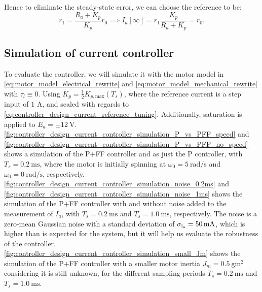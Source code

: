 Hence to eliminate the steady-state error, we can choose the reference to be:
\begin{equation}
    \label{eq:controller_design_current_reference_tuning}
    r_1 = \frac{R_a + K_p}{K_p} r_0 \implies I_a[\infty] = r_1 \frac{K_p}{R_a + K_p} = r_0.
\end{equation}

\subsection{Simulation of current controller}
\label{subsec:current_simulation}

To evaluate the controller, we will simulate it with the motor model in \cref{eq:motor_model_electrical_rewrite} and \cref{eq:motor_model_mechanical_rewrite} with $\tau_l \equiv 0$. Using $K_p=\frac{1}{2}K_{p,\text{max}}(T_s)$, where the reference current is a step input of $1$ A, and scaled with regards to \cref{eq:controller_design_current_reference_tuning}. Additionally, saturation is applied to $E_a=\pm\SI{12}{\volt}$. \cref{fig:controller_design_current_controller_simulation_P_vs_PFF_speed} and \cref{fig:controller_design_current_controller_simulation_P_vs_PFF_no_speed} shows a simulation of the P+FF controller and as just the P controller, with $T_s = \SI{0.2}{\milli\second}$, where the motor is initially spinning at $\omega_0 = \SI{5}{\radian\per\second}$ and $\omega_0 = \SI{0}{\radian\per\second}$, respectively. \cref{fig:controller_design_current_controller_simulation_noise_0.2ms} and \cref{fig:controller_design_current_controller_simulation_noise_1ms} shows the simulation of the P+FF controller with and without noise added to the measurement of $I_a$, with $T_s = \SI{0.2}{\milli\second}$ and $T_s = \SI{1.0}{\milli\second}$, respectively. The noise is a zero-mean Gaussian noise with a standard deviation of $\sigma_{{\scriptscriptstyle\mathrm{I_a}}} = \SI{50}{\milli\ampere}$, which is higher than is expected for the system, but it will help us evaluate the robustness of the controller. \cref{fig:controller_design_current_controller_simulation_small_Jm} shows the simulation of the P+FF controller with a smaller motor inertia $J_m=\SI{0.5}{\gram\metre\squared}$ considering it is still unknown, for the different sampling periods $T_s = \SI{0.2}{\milli\second}$ and $T_s = \SI{1.0}{\milli\second}$. 

